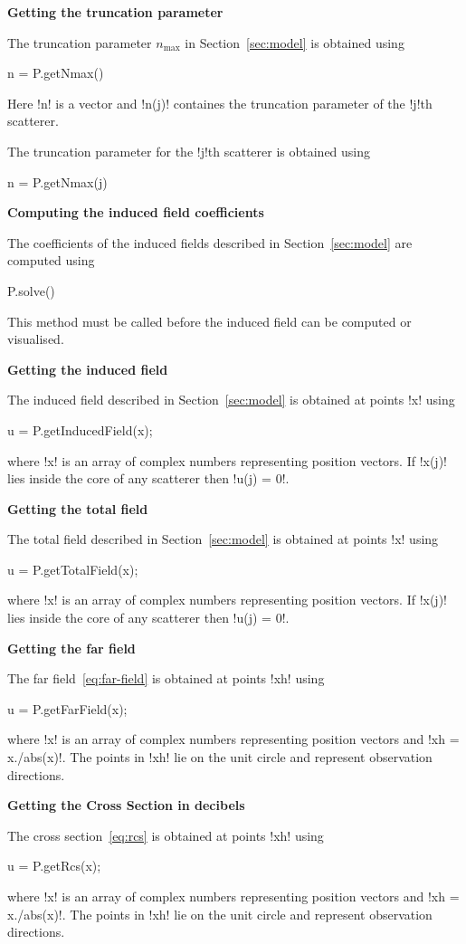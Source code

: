\documentclass[11pt,letterpaper]{article}
\newcommand{\nmax}{n_\mathrm{max}}
\newcommand{\techheading}[1]{%
    \par\vspace{-0.3\parskip}\noindent\hspace{-1cm}\textbf{#1}%
    \par\vspace{-0.5\parskip}\noindent\nopagebreak\ignorespaces}
\begin{document}
\techheading{Getting the truncation parameter}
The truncation parameter $\nmax$ in Section~\ref{sec:model} is obtained
using
\begin{matlab}
n = P.getNmax()
\end{matlab}
Here !n! is a vector and !n(j)! containes the truncation parameter of the
!j!th scatterer.

The truncation parameter for the !j!th scatterer is obtained using
\begin{matlab}
n = P.getNmax(j)
\end{matlab}

\techheading{Computing the induced field coefficients}
The coefficients of the induced fields described in Section~\ref{sec:model}
are computed using
\begin{matlab}
P.solve()
\end{matlab}
This method must be called before the induced field can be computed or
visualised.

\techheading{Getting the induced field}
The induced field described in Section~\ref{sec:model}
is obtained at points !x! using
\begin{matlab}
u = P.getInducedField(x);
\end{matlab}
where !x! is an array of complex numbers representing position vectors.
If !x(j)! lies inside the core of any scatterer then !u(j) = 0!.

\techheading{Getting the total field}
The total field described in Section~\ref{sec:model}
is obtained at points !x! using
\begin{matlab}
u = P.getTotalField(x);
\end{matlab}
where !x! is an array of complex numbers representing position vectors.
If !x(j)! lies inside the core of any scatterer then !u(j) = 0!.

\techheading{Getting the far field}
The far field~\eqref{eq:far-field}
is obtained at points !xh! using
\begin{matlab}
u = P.getFarField(x);
\end{matlab}
where !x! is an array of complex numbers representing position vectors
and !xh = x./abs(x)!.
The points in !xh! lie on the unit circle and represent observation
directions.

\techheading{Getting the Cross Section in decibels}
The cross section~\eqref{eq:rcs}
is obtained at points !xh! using
\begin{matlab}
u = P.getRcs(x);
\end{matlab}
where !x! is an array of complex numbers representing position vectors
and !xh = x./abs(x)!.
The points in !xh! lie on the unit circle and represent observation
directions.
\end{document}
